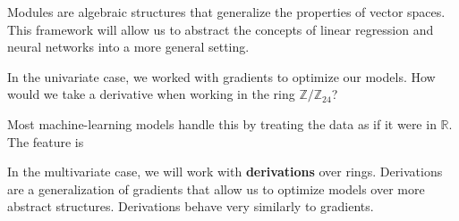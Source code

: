 Modules are algebraic structures that generalize the properties of vector spaces. This framework will allow us to abstract the concepts of linear regression and neural networks into a more general setting.

In the univariate case, we worked with gradients to optimize our models. How would we take a derivative when working in the ring $\mathbb{Z}/\mathbb{Z}_24$? 

Most machine-learning models handle this by treating the data as if it were in $\mathbb{R}$. The feature is 


In the multivariate case, we will work with \textbf{derivations} over rings. Derivations are a generalization of gradients that allow us to optimize models over more abstract structures. Derivations behave very similarly to gradients. 

%
